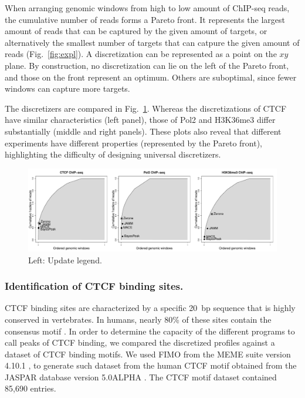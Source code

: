 \documentclass{bioinfo}
\begin{document}
When arranging genomic windows from high to low amount of ChIP-seq
reads, the cumulative number of reads forms a Pareto front.
It represents the largest amount of reads that can be captured by the
given amount of targets, or alternatively the smallest number of
targets that can catpure the given amount of reads
(Fig.~\ref{fig:expl}). A discretization can be represented as a point
on the $xy$ plane.  By construction, no discretization can lie on the
left of the Pareto front, and those on the front represent an
optimum. Others are suboptimal, since fewer windows can capture more
targets.

The discretizers are compared in Fig.~\ref{fig:pareto}. Whereas the
discretizations of CTCF have similar characteristics (left panel),
those of Pol2 and H3K36me3 differ substantially (middle and right
panels). These plots also reveal that different experiments have
different properties (represented by the Pareto front), highlighting
the difficulty of designing universal discretizers.

\begin{figure}
\centerline{\includegraphics[scale=0.4]{pareto_front.pdf}}
\caption{Left: Update legend.}
\label{fig:pareto}
\end{figure}


\subsubsection{Identification of CTCF binding sites.}
CTCF binding sites are characterized by a specific 20~bp sequence that
is highly conserved in vertebrates. In humans, nearly 80\% of these
sites contain the consensus motif \citep{pmid17382889}. In order to
determine the capacity of the different programs to call peaks of CTCF
binding, we compared the discretized profiles against a dataset of CTCF
binding motifs. We used FIMO \citep{pmid21330290} from the MEME suite
version 4.10.1 \citep{pmid19458158}, to generate such dataset from the
human CTCF motif obtained from the JASPAR database version
5.0{\textunderscore}ALPHA \citep{pmid24194598}. The CTCF motif dataset
contained 85,690 entries.
\end{document}
